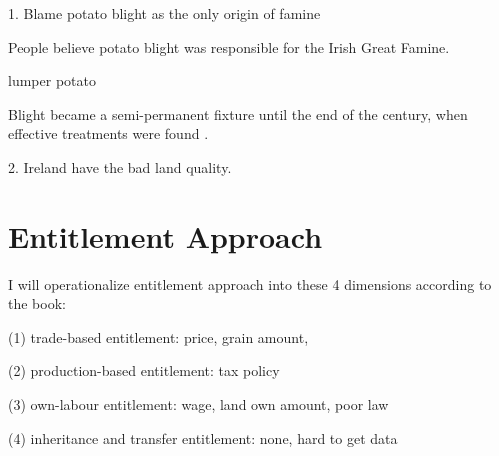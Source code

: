 1. Blame potato blight as the only origin of famine

People believe potato blight was responsible for the Irish Great Famine. 

lumper potato

Blight became a semi-permanent fixture until the end of the century, when effective treatments were found \citep{o1994economic}.

2. Ireland have the bad land quality.

\section{Entitlement Approach}

I will operationalize entitlement approach into these 4 dimensions according to the book:

(1) trade-based entitlement: price, grain amount, 

(2) production-based entitlement: tax policy

(3) own-labour entitlement: wage, land own amount, poor law

(4) inheritance and transfer entitlement: none, hard to get data






